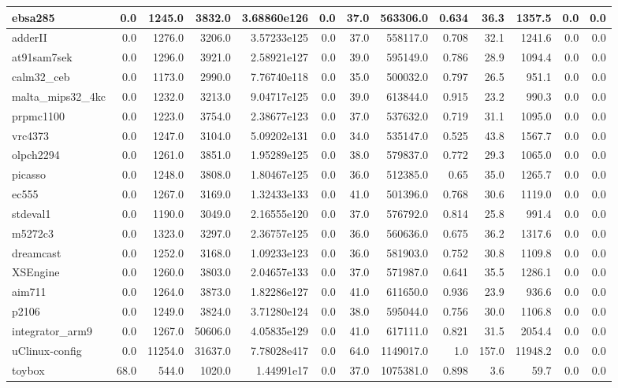 \begin{tabular}{|l r r r r| r r r r r r | r r|}
\hline
ebsa285 & 0.0 & 1245.0 & 3832.0 & 3.68860e126 & 0.0 & 37.0 & 563306.0 & 0.634 & 36.3 & 1357.5 & 0.0 & 0.0 \\
\hline
adderII & 0.0 & 1276.0 & 3206.0 & 3.57233e125 & 0.0 & 37.0 & 558117.0 & 0.708 & 32.1 & 1241.6 & 0.0 & 0.0 \\
\hline
at91sam7sek & 0.0 & 1296.0 & 3921.0 & 2.58921e127 & 0.0 & 39.0 & 595149.0 & 0.786 & 28.9 & 1094.4 & 0.0 & 0.0 \\
\hline
calm32\_ceb & 0.0 & 1173.0 & 2990.0 & 7.76740e118 & 0.0 & 35.0 & 500032.0 & 0.797 & 26.5 & 951.1 & 0.0 & 0.0 \\
\hline
malta\_mips32\_4kc & 0.0 & 1232.0 & 3213.0 & 9.04717e125 & 0.0 & 39.0 & 613844.0 & 0.915 & 23.2 & 990.3 & 0.0 & 0.0 \\
\hline
prpmc1100 & 0.0 & 1223.0 & 3754.0 & 2.38677e123 & 0.0 & 37.0 & 537632.0 & 0.719 & 31.1 & 1095.0 & 0.0 & 0.0 \\
\hline
vrc4373 & 0.0 & 1247.0 & 3104.0 & 5.09202e131 & 0.0 & 34.0 & 535147.0 & 0.525 & 43.8 & 1567.7 & 0.0 & 0.0 \\
\hline
olpch2294 & 0.0 & 1261.0 & 3851.0 & 1.95289e125 & 0.0 & 38.0 & 579837.0 & 0.772 & 29.3 & 1065.0 & 0.0 & 0.0 \\
\hline
picasso & 0.0 & 1248.0 & 3808.0 & 1.80467e125 & 0.0 & 36.0 & 512385.0 & 0.65 & 35.0 & 1265.7 & 0.0 & 0.0 \\
\hline
ec555 & 0.0 & 1267.0 & 3169.0 & 1.32433e133 & 0.0 & 41.0 & 501396.0 & 0.768 & 30.6 & 1119.0 & 0.0 & 0.0 \\
\hline
stdeval1 & 0.0 & 1190.0 & 3049.0 & 2.16555e120 & 0.0 & 37.0 & 576792.0 & 0.814 & 25.8 & 991.4 & 0.0 & 0.0 \\
\hline
m5272c3 & 0.0 & 1323.0 & 3297.0 & 2.36757e125 & 0.0 & 36.0 & 560636.0 & 0.675 & 36.2 & 1317.6 & 0.0 & 0.0 \\
\hline
dreamcast & 0.0 & 1252.0 & 3168.0 & 1.09233e123 & 0.0 & 36.0 & 581903.0 & 0.752 & 30.8 & 1109.8 & 0.0 & 0.0 \\
\hline
XSEngine & 0.0 & 1260.0 & 3803.0 & 2.04657e133 & 0.0 & 37.0 & 571987.0 & 0.641 & 35.5 & 1286.1 & 0.0 & 0.0 \\
\hline
aim711 & 0.0 & 1264.0 & 3873.0 & 1.82286e127 & 0.0 & 41.0 & 611650.0 & 0.936 & 23.9 & 936.6 & 0.0 & 0.0 \\
\hline
p2106 & 0.0 & 1249.0 & 3824.0 & 3.71280e124 & 0.0 & 38.0 & 595044.0 & 0.756 & 30.0 & 1106.8 & 0.0 & 0.0 \\
\hline
integrator\_arm9 & 0.0 & 1267.0 & 50606.0 & 4.05835e129 & 0.0 & 41.0 & 617111.0 & 0.821 & 31.5 & 2054.4 & 0.0 & 0.0 \\
\hline
uClinux-config & 0.0 & 11254.0 & 31637.0 & 7.78028e417 & 0.0 & 64.0 & 1149017.0 & 1.0 & 157.0 & 11948.2 & 0.0 & 0.0 \\
\hline
toybox & 68.0 & 544.0 & 1020.0 & 1.44991e17 & 0.0 & 37.0 & 1075381.0 & 0.898 & 3.6 & 59.7 & 0.0 & 0.0 \\
\hline
\end{tabular}